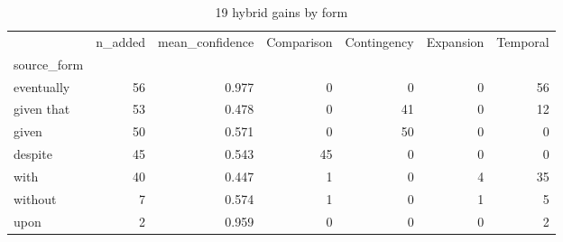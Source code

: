 \begin{table}
\caption{19 hybrid gains by form}
\begin{tabular}{lrrrrrr}
\toprule
 & n\_added & mean\_confidence & Comparison & Contingency & Expansion & Temporal \\
source_form &  &  &  &  &  &  \\
\midrule
eventually & 56 & 0.977 & 0 & 0 & 0 & 56 \\
given that & 53 & 0.478 & 0 & 41 & 0 & 12 \\
given & 50 & 0.571 & 0 & 50 & 0 & 0 \\
despite & 45 & 0.543 & 45 & 0 & 0 & 0 \\
with & 40 & 0.447 & 1 & 0 & 4 & 35 \\
without & 7 & 0.574 & 1 & 0 & 1 & 5 \\
upon & 2 & 0.959 & 0 & 0 & 0 & 2 \\
\bottomrule
\end{tabular}
\end{table}
